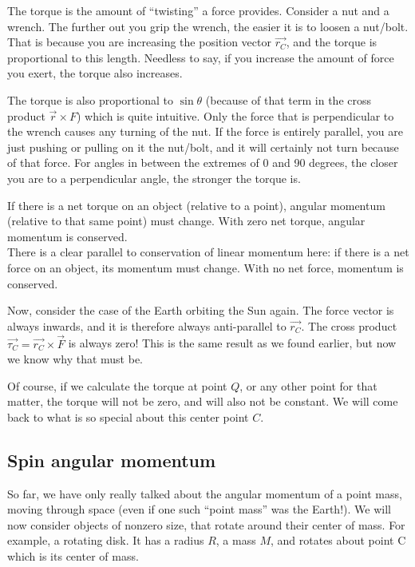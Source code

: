 The torque is the amount of ``twisting'' a force provides. Consider a nut and a wrench. The further out you grip the wrench, the easier it is to loosen a nut/bolt. That is because you are increasing the position vector $\vec{r_C}$, and the torque is proportional to this length. Needless to say, if you increase the amount of force you exert, the torque also increases.

The torque is also proportional to $\sin \theta$ (because of that term in the cross product $\vec{r} \times {F}$) which is quite intuitive. Only the force that is perpendicular to the wrench causes any turning of the nut. If the force is entirely parallel, you are just pushing or pulling on it the nut/bolt, and it will certainly not turn because of that force. For angles in between the extremes of 0 and 90 degrees, the closer you are to a perpendicular angle, the stronger the torque is.

If there is a net torque on an object (relative to a point), angular momentum (relative to that same point) must change. With zero net torque, angular momentum is conserved.\\
There is a clear parallel to conservation of linear momentum here: if there is a net force on an object, its momentum must change. With no net force, momentum is conserved.

Now, consider the case of the Earth orbiting the Sun again. The force vector is always inwards, and it is therefore always anti-parallel to $\vec{r_C}$. The cross product $\vec{\tau_C} = \vec{r_C} \times \vec{F}$ is always zero! This is the same result as we found earlier, but now we know why that must be.

Of course, if we calculate the torque at point $Q$, or any other point for that matter, the torque will not be zero, and will also not be constant. We will come back to what is so special about this center point $C$.

\subsection{Spin angular momentum}

So far, we have only really talked about the angular momentum of a point mass, moving through space (even if one such ``point mass'' was the Earth!). We will now consider objects of nonzero size, that rotate around their center of mass. For example, a rotating disk. It has a radius $R$, a mass $M$, and rotates about point C which is its center of mass.

